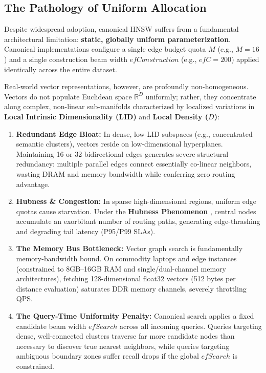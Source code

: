 \documentclass[conference,10pt]{IEEEtran}
\begin{document}
\subsection{The Pathology of Uniform Allocation}
Despite widespread adoption, canonical HNSW suffers from a fundamental architectural limitation: \textbf{static, globally uniform parameterization}. Canonical implementations configure a single edge budget quota $M$ (e.g., $M=16$) and a single construction beam width $efConstruction$ (e.g., $efC=200$) applied identically across the entire dataset.

Real-world vector representations, however, are profoundly non-homogeneous. Vectors do not populate Euclidean space $\mathbb{R}^D$ uniformly; rather, they concentrate along complex, non-linear sub-manifolds characterized by localized variations in \textbf{Local Intrinsic Dimensionality (LID)} and \textbf{Local Density ($D$)}:
\begin{enumerate}
    \item \textbf{Redundant Edge Bloat:} In dense, low-LID subspaces (e.g., concentrated semantic clusters), vectors reside on low-dimensional hyperplanes. Maintaining 16 or 32 bidirectional edges generates severe structural redundancy: multiple parallel edges connect essentially co-linear neighbors, wasting DRAM and memory bandwidth while conferring zero routing advantage.
    \item \textbf{Hubness \& Congestion:} In sparse high-dimensional regions, uniform edge quotas cause starvation. Under the \textbf{Hubness Phenomenon} \cite{radovanovic2010hubs}, central nodes accumulate an exorbitant number of routing paths, generating edge-thrashing and degrading tail latency (P95/P99 SLAs).
    \item \textbf{The Memory Bus Bottleneck:} Vector graph search is fundamentally memory-bandwidth bound. On commodity laptops and edge instances (constrained to 8GB--16GB RAM and single/dual-channel memory architectures), fetching 128-dimensional float32 vectors (512 bytes per distance evaluation) saturates DDR memory channels, severely throttling QPS.
    \item \textbf{The Query-Time Uniformity Penalty:} Canonical search applies a fixed candidate beam width $efSearch$ across all incoming queries. Queries targeting dense, well-connected clusters traverse far more candidate nodes than necessary to discover true nearest neighbors, while queries targeting ambiguous boundary zones suffer recall drops if the global $efSearch$ is constrained.
\end{enumerate}
\end{document}
